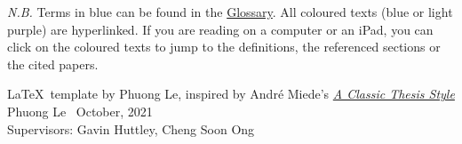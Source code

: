 \thispagestyle{empty}

\textit{N.B.} Terms in blue can be found in the \hyperref[glossary]{Glossary}. All coloured texts (blue or light purple) are hyperlinked. If you are reading on a computer or an iPad, you can click on the coloured texts to jump to the definitions, the referenced sections or the cited papers.

\vfill
\normalsize
\LaTeX\ template by 
Phuong Le, inspired by André Miede's \href{https://bitbucket.org/amiede/classicthesis/wiki/Home}{\textit{A Classic Thesis Style}} \\
Phuong Le \textcopyright\ October, 2021 \\
Supervisors: Gavin Huttley, Cheng Soon Ong

\newpage